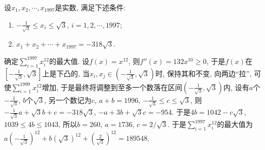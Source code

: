 \bq{}{}
设$x_{1},x_{2},\cdots,x_{1997}$是实数, 满足下述条件:
\begin{enumerate}
\item $-\frac{1}{\sqrt{3}}\le x_{i}\le\sqrt{3}$, $i=1,2,\cdots,1997$;
\item $x_{1}+x_{2}+\cdots+x_{1997}=-318\sqrt{3}$.
\end{enumerate}
确定$\sum_{i=1}^{1997}x_{i}^{12}$的最大值.
\eq
\ba
设$f(x)=x^{12}$, 则$f''(x)=132x^{10}\ge0$, 于是$f(x)$在$\left[-\frac{1}{\sqrt{3}},\sqrt{3}\right]$上是下凸的,
当$x_{i},x_{j}\in\left(-\frac{1}{\sqrt{3}},\sqrt{3}\right)$时, 保持其和不变,
向两边``拉'', 可使$\sum_{i=1}^{1999}x_{i}^{12}$增加, 于是最终将调整到至多一个数落在区间$\left(-\frac{1}{\sqrt{3}},\sqrt{3}\right)$内,
设有$a$个$-\frac{1}{\sqrt{3}}$, $b$个$\sqrt{3}$, 另一个数记为$c$, $a+b=1996$,
$-\frac{1}{\sqrt{3}}\le c\le\sqrt{3}$, 则$-\frac{1}{\sqrt{3}}a+\sqrt{3}b+c=-318\sqrt{3}$,
$-a+3b+\sqrt{3}c=-954$. 于是$4b=1042-c\sqrt{3}$, $1039\le4b\le1043$,
所以$b=260$, $a=1736$, $c=2/\sqrt{3}$. 于是$\sum_{i=1}^{1997}x_{i}^{12}$的最大值为$a\left(-\frac{1}{\sqrt{3}}\right)^{12}+b\left(\sqrt{3}\right)^{12}+\left(\frac{2}{\sqrt{3}}\right)^{12}=189548$.
\ea
